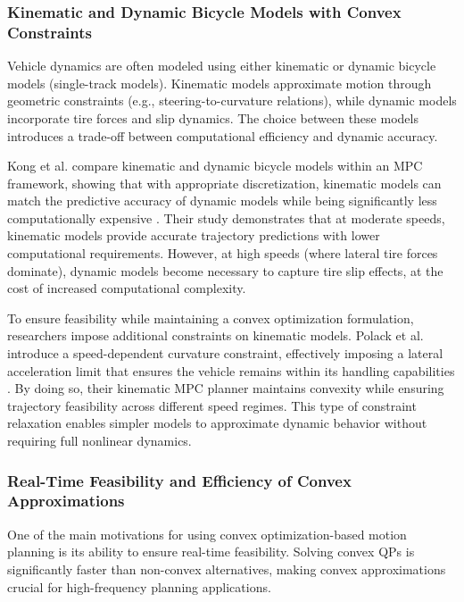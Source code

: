 \subsubsection{Kinematic and Dynamic Bicycle Models with Convex Constraints}

Vehicle dynamics are often modeled using either kinematic or dynamic bicycle models (single-track models).
Kinematic models approximate motion through geometric constraints (e.g., steering-to-curvature relations), while dynamic models incorporate tire
forces and slip dynamics.
The choice between these models introduces a trade-off between computational efficiency and dynamic accuracy.

Kong et al.
compare kinematic and dynamic bicycle models within an MPC framework, showing that with appropriate discretization, kinematic models can match the predictive accuracy of dynamic models while being significantly less computationally expensive \cite{kong_kinematic_2015}.
Their study demonstrates that at moderate speeds, kinematic models provide accurate trajectory predictions with lower computational requirements.
However, at high speeds (where lateral tire forces dominate), dynamic models become necessary to capture tire slip effects, at the cost of increased
computational complexity.

To ensure feasibility while maintaining a convex optimization formulation, researchers impose additional constraints on kinematic models.
Polack et al.
introduce a speed-dependent curvature constraint, effectively imposing a lateral acceleration limit that ensures the vehicle remains within its handling capabilities \cite{polack_guaranteeing_2018}.
By doing so, their kinematic MPC planner maintains convexity while ensuring trajectory feasibility across different speed regimes.
This type of constraint relaxation enables simpler models to approximate dynamic behavior without requiring full nonlinear dynamics.

\subsubsection{Real-Time Feasibility and Efficiency of Convex Approximations}

One of the main motivations for using convex optimization-based motion planning is its ability to ensure real-time feasibility.
Solving convex QPs is significantly faster than non-convex alternatives, making convex approximations crucial for high-frequency planning
applications.

